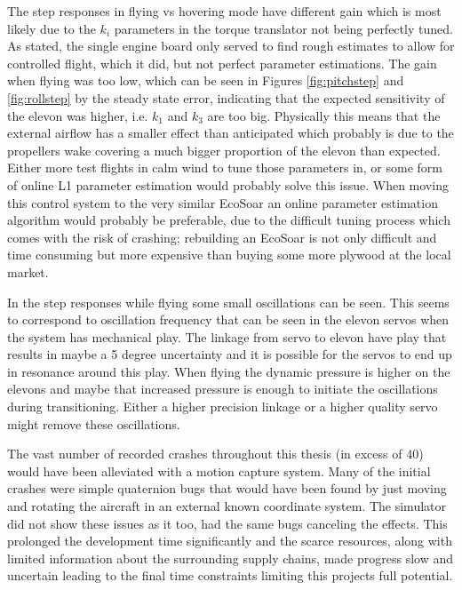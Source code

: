\documentclass{article}
\begin{document}
The step responses in flying vs hovering mode have different gain which is most likely due to the $k_i$ parameters in the torque translator not being perfectly tuned.
As stated, the single engine board only served to find rough estimates to allow for controlled flight, which it did, but not perfect parameter estimations.
The gain when flying was too low, which can be seen in Figures \ref{fig:pitchstep} and \ref{fig:rollstep} by the steady state error, indicating that the expected sensitivity of the elevon was higher, i.e. $k_1$ and $k_3$ are too big.
Physically this means that the external airflow has a smaller effect than anticipated which probably is due to the propellers wake covering a much bigger proportion of the elevon than expected.
Either more test flights in calm wind to tune those parameters in, or some form of online L1 parameter estimation would probably solve this issue.
When moving this control system to the very similar EcoSoar an online parameter estimation algorithm would probably be preferable, due to the difficult tuning process which comes with the risk of crashing; rebuilding an EcoSoar is not only difficult and time consuming but more expensive than buying some more plywood at the local market.

In the step responses while flying some small oscillations can be seen.
This seems to correspond to oscillation frequency that can be seen in the elevon servos when the system has mechanical play.
The linkage from servo to elevon have play that results in maybe a 5 degree uncertainty and it is possible for the servos to end up in resonance around this play.
When flying the dynamic pressure is higher on the elevons and maybe that increased pressure is enough to initiate the oscillations during transitioning.
Either a higher precision linkage or a higher quality servo might remove these oscillations.

The vast number of recorded crashes throughout this thesis (in excess of 40) would have been alleviated with a motion capture system.
Many of the initial crashes were simple quaternion bugs that would have been found by just moving and rotating the aircraft in an external known coordinate system.
The simulator did not show these issues as it too, had the same bugs canceling the effects.
This prolonged the development time significantly and the scarce resources, along with limited information about the surrounding supply chains, made progress slow and uncertain leading to the final time constraints limiting this projects full potential.
\end{document}
